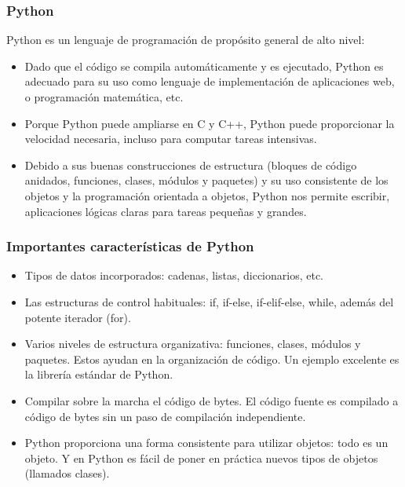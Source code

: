 \documentclass[10pt]{beamer}
\begin{document}
\begin{frame}[fragile]
\frametitle{Python}
Python es un lenguaje de programaci\'on de prop\'osito general de alto nivel:
\begin{itemize}
\item Dado que el c\'odigo se compila autom\'aticamente y es  ejecutado, Python es adecuado para su uso como lenguaje de implementaci\'on de aplicaciones web, o programaci\'on matem\'atica, etc.
\item Porque Python puede ampliarse en C y C++, Python puede proporcionar la velocidad necesaria, incluso para computar tareas intensivas.
\item Debido a sus buenas  construcciones de estructura  (bloques de c\'odigo anidados, funciones, clases, m\'odulos y paquetes) y su uso consistente de los objetos y la programaci\'on orientada a objetos, Python nos permite escribir, aplicaciones l\'ogicas claras para tareas peque\~nas y grandes.
\end{itemize}
\end{frame}

\begin{frame}[fragile]
\frametitle{Importantes caracter\'isticas de Python}

\begin{itemize}
\item Tipos de datos incorporados: cadenas, listas, diccionarios, etc.
\item Las estructuras de control habituales: if, if-else, if-elif-else, while, adem\'as del potente iterador (for).
\item Varios niveles de estructura organizativa: funciones, clases, m\'odulos y paquetes. Estos ayudan en la organizaci\'on de c\'odigo. Un ejemplo excelente  es la librer\'ia est\'andar de Python.
\item Compilar sobre la marcha el  c\'odigo de bytes. El c\'odigo fuente es compilado a c\'odigo de bytes sin un paso de compilaci\'on independiente.
\item Python proporciona una forma consistente para utilizar objetos: todo es un objeto. Y en Python es f\'acil de poner en pr\'actica nuevos tipos de objetos (llamados clases).
\end{itemize}
\end{frame}
\end{document}
